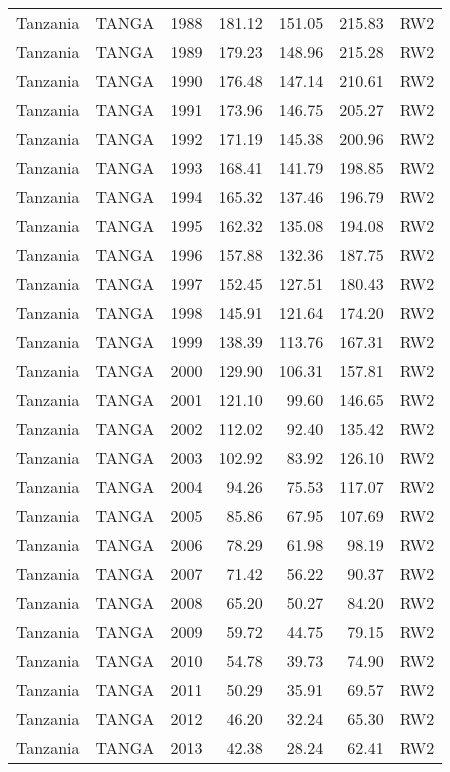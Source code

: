 \begin{longtable}{lllrrrl}
  Tanzania & TANGA & 1988 & 181.12 & 151.05 & 215.83 & RW2 \\ 
  Tanzania & TANGA & 1989 & 179.23 & 148.96 & 215.28 & RW2 \\ 
  Tanzania & TANGA & 1990 & 176.48 & 147.14 & 210.61 & RW2 \\ 
  Tanzania & TANGA & 1991 & 173.96 & 146.75 & 205.27 & RW2 \\ 
  Tanzania & TANGA & 1992 & 171.19 & 145.38 & 200.96 & RW2 \\ 
  Tanzania & TANGA & 1993 & 168.41 & 141.79 & 198.85 & RW2 \\ 
  Tanzania & TANGA & 1994 & 165.32 & 137.46 & 196.79 & RW2 \\ 
  Tanzania & TANGA & 1995 & 162.32 & 135.08 & 194.08 & RW2 \\ 
  Tanzania & TANGA & 1996 & 157.88 & 132.36 & 187.75 & RW2 \\ 
  Tanzania & TANGA & 1997 & 152.45 & 127.51 & 180.43 & RW2 \\ 
  Tanzania & TANGA & 1998 & 145.91 & 121.64 & 174.20 & RW2 \\ 
  Tanzania & TANGA & 1999 & 138.39 & 113.76 & 167.31 & RW2 \\ 
  Tanzania & TANGA & 2000 & 129.90 & 106.31 & 157.81 & RW2 \\ 
  Tanzania & TANGA & 2001 & 121.10 & 99.60 & 146.65 & RW2 \\ 
  Tanzania & TANGA & 2002 & 112.02 & 92.40 & 135.42 & RW2 \\ 
  Tanzania & TANGA & 2003 & 102.92 & 83.92 & 126.10 & RW2 \\ 
  Tanzania & TANGA & 2004 & 94.26 & 75.53 & 117.07 & RW2 \\ 
  Tanzania & TANGA & 2005 & 85.86 & 67.95 & 107.69 & RW2 \\ 
  Tanzania & TANGA & 2006 & 78.29 & 61.98 & 98.19 & RW2 \\ 
  Tanzania & TANGA & 2007 & 71.42 & 56.22 & 90.37 & RW2 \\ 
  Tanzania & TANGA & 2008 & 65.20 & 50.27 & 84.20 & RW2 \\ 
  Tanzania & TANGA & 2009 & 59.72 & 44.75 & 79.15 & RW2 \\ 
  Tanzania & TANGA & 2010 & 54.78 & 39.73 & 74.90 & RW2 \\ 
  Tanzania & TANGA & 2011 & 50.29 & 35.91 & 69.57 & RW2 \\ 
  Tanzania & TANGA & 2012 & 46.20 & 32.24 & 65.30 & RW2 \\ 
  Tanzania & TANGA & 2013 & 42.38 & 28.24 & 62.41 & RW2 \\ 

\end{longtable}
